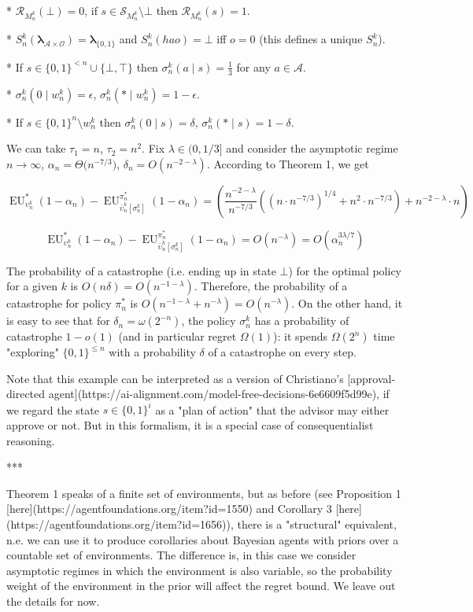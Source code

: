 \documentclass[a4paper]{article}
\newcommand{\Bool}{\{0,1\}}
\newcommand{\AP}[1]{\left(#1\right)}
\newcommand{\AB}[1]{\left[#1\right]}
\newcommand{\Estr}{\boldsymbol{\lambda}}
\newcommand{\Ob}{\mathcal{O}}
\newcommand{\A}{\mathcal{A}}
\newcommand{\St}{\mathcal{S}}
\newcommand{\R}{\mathcal{R}}
\newcommand{\EU}{\operatorname{EU}}
\begin{document}
* $\R_{M_n^k}(\bot)=0$, if $s \in \St_{M_n^k} \setminus \bot$ then $\R_{M_n^k}(s)=1$.

* $S_n^k(\Estr_{\A \times \Ob})=\Estr_{\Bool}$ and $S_n^k(hao)=\bot$ iff $o = 0$ (this defines a unique $S_n^k$).

* If $s \in \Bool^{<n} \cup \{\bot,\top\}$ then $\sigma_n^k(a \mid s) = \frac{1}{3}$ for any $a \in \A$.

* $\sigma_n^k(0 \mid w_n^k) = \epsilon$, $\sigma_n^k(* \mid w_n^k) = 1 - \epsilon$.

* If $s \in \Bool^n \setminus w_n^k$ then $\sigma_n^k(0 \mid s) = \delta$, $\sigma_n^k(* \mid s) = 1 - \delta$.

We can take $\tau_1 = n$, $\tau_2 = n^2$. Fix $\lambda \in (0,1/3]$ and consider the asymptotic regime $n \rightarrow \infty$, $\alpha_n = \Theta\Big(n^{-7/3}\Big)$, $\delta_n = O\AP{n^{-2-\lambda}}$. According to Theorem 1, we get

$$\EU_{\upsilon_n^k}^*(1-\alpha_n) - \EU_{\bar{\upsilon}_n^k\AB{\sigma_n^k}}^{\pi_n^*}(1-\alpha_n) = \AP{\frac{n^{-2-\lambda}}{n^{-7/3}}\AP{\AP{n \cdot n^{-7/3}}^{1/4}+n^2 \cdot n^{-7/3}}+n^{-2-\lambda}\cdot n}$$

$$\EU_{\upsilon_n^k}^*(1-\alpha_n) - \EU_{\bar{\upsilon}_n^k\AB{\sigma_n^k}}^{\pi_n^*}(1-\alpha_n) = O\AP{n^{-\lambda}}=O\AP{\alpha_n^{3\lambda/7}}$$

The probability of a catastrophe (i.e. ending up in state $\bot$) for the optimal policy for a given $k$ is $O\AP{n\delta}=O\AP{n^{-1-\lambda}}$. Therefore, the probability of a catastrophe for policy $\pi_n^*$ is $O\AP{n^{-1-\lambda}+n^{-\lambda}}=O\AP{n^{-\lambda}}$. On the other hand, it is easy to see that for $\delta_n = \omega\AP{2^{-n}}$, the policy $\sigma_n^k$ has a probability of catastrophe $1-o(1)$ (and in particular  regret $\Omega(1)$): it spends $\Omega(2^n)$ time "exploring" $\Bool^{\leq n}$ with a probability $\delta$ of a catastrophe on every step.

Note that this example can be interpreted as a version of Christiano's [approval-directed agent](https://ai-alignment.com/model-free-decisions-6e6609f5d99e), if we regard the state $s \in \Bool^{i}$ as a "plan of action" that the advisor may either approve or not. But in this formalism, it is a special case of consequentialist reasoning.

***

Theorem 1 speaks of a finite set of environments, but as before (see Proposition 1 [here](https://agentfoundations.org/item?id=1550) and Corollary 3 [here](https://agentfoundations.org/item?id=1656)), there is a "structural" equivalent, n.e. we can use it to produce corollaries about Bayesian agents with priors over a countable set of environments. The difference is, in this case we consider asymptotic regimes in which the environment is also variable, so the probability weight of the environment in the prior will affect the regret bound. We leave out the details for now.
\end{document}
